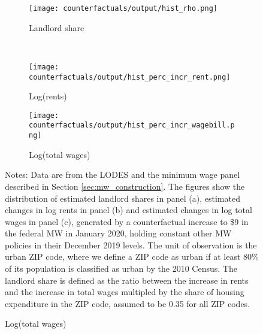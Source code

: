 \begin{figure}[h!]
    \centering
    \caption{Distributions of estimated landlord shares and counterfactual 
                changes in rents and total wages, urban ZIP codes}
    \label{fig:cf_hist_rents_wages_shares}

    \begin{subfigure}{0.65\textwidth}
        \caption*{Landlord share}
        \texttt{[image: counterfactuals/output/hist\_rho.png]}
    \end{subfigure}\\
    \begin{subfigure}{0.5\textwidth}
        \texttt{[image: counterfactuals/output/hist\_perc\_incr\_rent.png]}
        \caption*{Log(rents)}
    \end{subfigure}%
    \begin{subfigure}{0.5\textwidth}
        \texttt{[image: counterfactuals/output/hist\_perc\_incr\_wagebill.png]}
        \caption*{Log(total wages)}
    \end{subfigure}

    \begin{minipage}{.95\textwidth} \footnotesize
        \vspace{3mm}
        Notes: 
        Data are from the LODES and the minimum wage panel described in Section 
        \ref{sec:mw_construction}.
        The figures show the distribution of estimated landlord shares in 
        panel (a), estimated changes in log rents in panel (b) and 
        estimated changes in log total wages in panel (c),
        generated by a counterfactual increase to \$9 in the federal MW in 
        January 2020, holding constant other MW policies in their December 2019 
        levels.
        The unit of observation is the urban ZIP code, where we define a ZIP code 
        as urban if at least 80\% of its population is classified as urban by
        the 2010 Census.
        The landlord share is defined as the ratio between the increase in rents
        and the increase in total wages multipled by the share of housing 
        expenditure in the ZIP code, assumed to be 0.35 for all ZIP codes.
    \end{minipage}
\end{figure}
